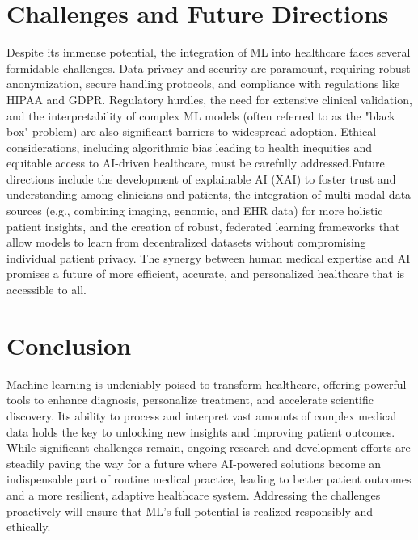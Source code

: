 \documentclass[11pt]{article}
\begin{document}
\section{Challenges and Future Directions}

Despite its immense potential, the integration of ML into healthcare faces several formidable challenges. Data privacy and security are paramount, requiring robust anonymization, secure handling protocols, and compliance with regulations like HIPAA and GDPR. Regulatory hurdles, the need for extensive clinical validation, and the interpretability of complex ML models (often referred to as the "black box" problem) are also significant barriers to widespread adoption. Ethical considerations, including algorithmic bias leading to health inequities and equitable access to AI-driven healthcare, must be carefully addressed.Future directions include the development of explainable AI (XAI) to foster trust and understanding among clinicians and patients, the integration of multi-modal data sources (e.g., combining imaging, genomic, and EHR data) for more holistic patient insights, and the creation of robust, federated learning frameworks that allow models to learn from decentralized datasets without compromising individual patient privacy. The synergy between human medical expertise and AI promises a future of more efficient, accurate, and personalized healthcare that is accessible to all.

\section{Conclusion}

Machine learning is undeniably poised to transform healthcare, offering powerful tools to enhance diagnosis, personalize treatment, and accelerate scientific discovery. Its ability to process and interpret vast amounts of complex medical data holds the key to unlocking new insights and improving patient outcomes. While significant challenges remain, ongoing research and development efforts are steadily paving the way for a future where AI-powered solutions become an indispensable part of routine medical practice, leading to better patient outcomes and a more resilient, adaptive healthcare system. Addressing the challenges proactively will ensure that ML's full potential is realized responsibly and ethically.
\end{document}
